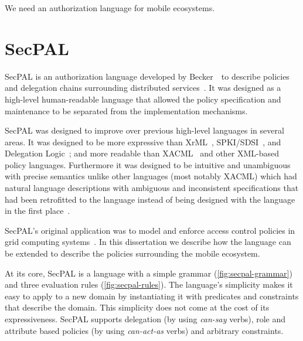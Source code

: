 \documentclass[thesis.tex]{subfiles}
\begin{document}
We need an authorization language for mobile ecosystems.

\section{SecPAL}

SecPAL is an authorization language developed by Becker~\etal~to
describe policies and delegation chains surrounding distributed
services~\cite{becker_secpal:_2010}. It was designed as a high-level
human-readable language that allowed the policy specification and
maintenance to be separated from the implementation mechanisms.

SecPAL was designed to improve over previous high-level languages in
several areas.  It was designed to be more expressive than
XrML~\cite{kolovski_logic-based_2007},
SPKI/SDSI~\cite{ellison_spki_1999}, and Delegation
Logic~\cite{li_delegation_2003}; and more readable than
XACML~\cite{oasis_extensible_2013} and other XML-based policy
languages.  Furthermore it was designed to be intuitive and
unambiguous with precise semantics unlike other languages (most notably
XACML) which had natural language descriptions with ambiguous and
inconsistent specifications that had been retrofitted to the language
instead of being designed with the language in the first
place~\cite{bryans_reasoning_2005,ramli_logic_2014,masi_formalisation_2012}.

SecPAL's original application was to model and enforce access control
policies in grid computing systems~\cite{becker_secpal:_2010}.  In
this dissertation we describe how the language can be extended to
describe the policies surrounding the mobile ecosystem.

At its core, SecPAL is a language with a simple grammar
(\autoref{fig:secpal-grammar}) and three evaluation rules
(\autoref{fig:secpal-rules}). The language's simplicity makes it easy
to apply to a new domain by instantiating it with predicates and
constraints that describe the domain. This simplicity does not come at
the cost of its expressiveness. SecPAL supports delegation (by using
\emph{can-say} verbs), role and attribute based policies (by using
\emph{can-act-as} verbs) and arbitrary constraints.
\end{document}
